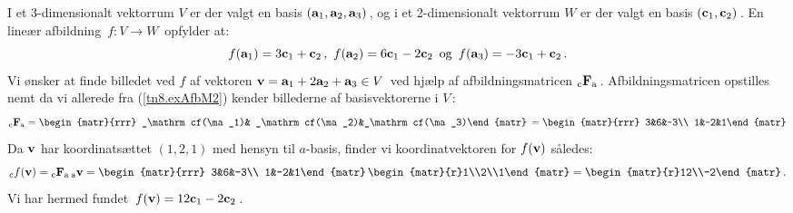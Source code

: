 \begin{example} \label{tn8.brugAfbM1}
I et 3-dimensionalt vektorrum $V$ er der valgt en basis $(\mathbf{a}_1,\mathbf{a}_2,\mathbf{a}_3)\,$, og i et 2-dimensionalt vektorrum $W$ er der valgt en basis $(\mathbf{c}_1,\mathbf{c}_2)\,$. En lineær afbildning $\,f:V\rightarrow W\,$ opfylder at:
\begin{equation}\label{tn8.exAfbM2}
f(\mathbf{a}_1)=3\mathbf{c}_1+\mathbf{c}_2\,,\,\,f(\mathbf{a}_2)=6\mathbf{c}_1-2\mathbf{c}_2\,\,\,\mathrm{og}\,\,\,f(\mathbf{a}_3)=-3\mathbf{c}_1+\mathbf{c}_2\,.
\end{equation}
Vi ønsker at finde billedet ved $f$ af vektoren $\mathbf{v}=\mathbf{a}_1+2\mathbf{a}_2+\mathbf{a}_3\in V\,$ ved hjælp af afbildningsmatricen ${_\mathrm{c}\mathbf{F}_\mathrm{a}}\,$. Afbildningsmatricen opstilles nemt da vi allerede fra (\ref{tn8.exAfbM2}) kender billederne af basisvektorerne i $V\,$:
\begin{equation*}
\matind cFa = \begin{matr}{rrr}
_\mathrm cf(\ma_1)& _\mathrm cf(\ma_2)&_\mathrm cf(\ma_3)\end{matr}\,
=\begin{matr}{rrr}
3&6&-3\\
1&-2&1\end{matr}
\end{equation*}
Da $\mathbf{v}$ har koordinatsættet $(1,2,1)$ med hensyn til $a$-basis, finder vi koordinatvektoren for $f(\mathbf{v})$ således:
$$_\mathrm cf(\mv)= \matind cFa \, \vekind av = \begin{matr}{rrr}
3&6&-3\\
1&-2&1\end{matr}\,\begin{matr}{r}1\\2\\1\end{matr}
=\begin{matr}{r}12\\-2\end{matr}\,.
$$
Vi har hermed fundet $\,f(\mathbf{v})=12\mathbf{c}_1-2\mathbf{c}_2\,$.
\end{example}

